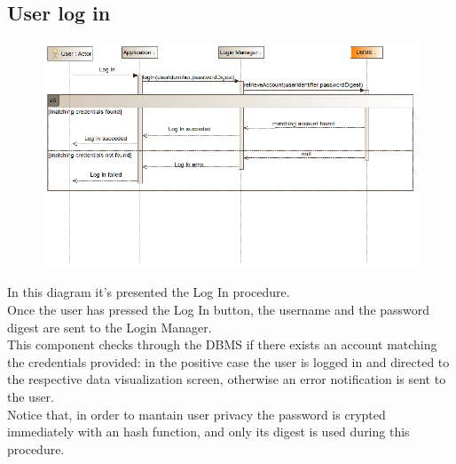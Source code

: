 \subsection{User log in}
\begin{figure}[H]
\centering
\includegraphics[width=\linewidth]{resources/uml/sequence/LogIn.png}
\end{figure}
In this diagram it's presented the Log In procedure.\\
Once the user has pressed the Log In button, the username and the password digest are sent to the Login Manager.\\
This component checks through the DBMS if there exists an account matching the credentials provided: in the positive case the user is logged in and directed to the respective data visualization screen, otherwise an error notification is sent to the user.\\
Notice that, in order to mantain user privacy the password is crypted immediately with an hash function, and only its digest is used during this procedure.



